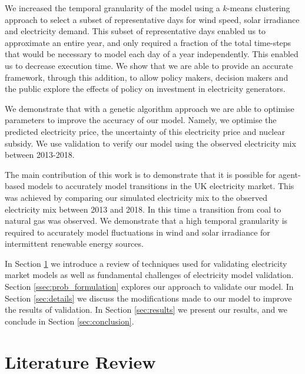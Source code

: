 We increased the temporal granularity of the model using a $k$-means clustering approach to select a subset of representative days for wind speed, solar irradiance and electricity demand. This subset of representative days enabled us to approximate an entire year, and only required a fraction of the total time-steps that would be necessary to model each day of a year independently. This enabled us to  decrease execution time. We show that we are able to provide an accurate framework, through this addition, to allow policy makers, decision makers and the public explore the effects of policy on investment in electricity generators. 


We demonstrate that with a genetic algorithm approach we are able to optimise parameters to improve the accuracy of our model. Namely, we optimise the predicted electricity price, the uncertainty of this electricity price and nuclear subsidy. We use validation to verify our model using the observed electricity mix between 2013-2018.

The main contribution of this work is to demonstrate that it is possible for agent-based models to accurately model transitions in the UK electricity market. This was achieved by comparing our simulated electricity mix to the observed electricity mix between 2013 and 2018. In this time a transition from coal to natural gas was observed. We demonstrate that a high temporal granularity is required to accurately model fluctuations in wind and solar irradiance for intermittent renewable energy sources.


In Section \ref{lit-review} we introduce a review of techniques used for validating electricity market models as well as fundamental challenges of electricity model validation. Section \ref{ssec:prob_formulation} explores our approach to validate our model. In Section \ref{sec:details} we discuss the modifications made to our model to improve the results of validation. In Section \ref{sec:results} we present our results, and we conclude in Section \ref{sec:conclusion}.

\section{Literature Review}
\label{lit-review}



